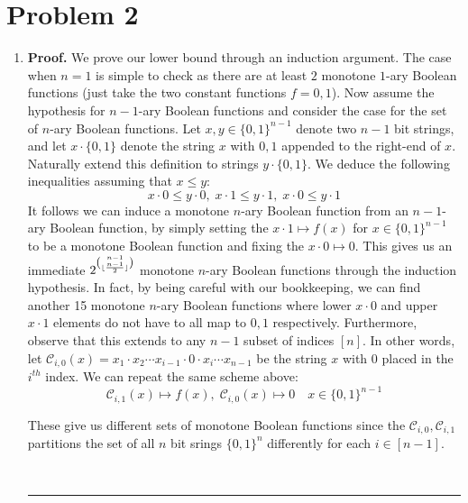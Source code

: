 \documentclass[12pt]{article}%
\DeclarePairedDelimiter\floor{\lfloor}{\rfloor}
\newenvironment{proof}[1][Proof]{\textbf{#1.} }{\ \rule{0.5em}{0.5em}}
\begin{document}
\section{Problem 2}
\begin{enumerate}
  \item
  \begin{proof}
    We prove our lower bound through an induction argument. The case when $n=1$ is simple to check as there are at least $2$ monotone $1$-ary Boolean functions (just take the two constant functions $f = 0,1$). Now assume the hypothesis for $n-1$-ary Boolean functions and consider the case for the set of $n$-ary Boolean functions.
    Let $x,y \in \{0,1\}^{n-1}$ denote two $n-1$ bit strings, and let $x\cdot \{0,1\}$ denote the string $x$ with $0,1$ appended to the right-end of $x$. Naturally extend this definition to strings $y\cdot \{0,1\}$.  We deduce the following inequalities assuming that $x \leq y$:
    $$ x \cdot 0 \leq y \cdot 0, \; x \cdot 1 \leq y \cdot 1, \; x \cdot 0 \leq y \cdot 1 $$
    It follows we can induce a monotone $n$-ary Boolean function from an $n-1$-ary Boolean function, by simply setting the $x\cdot 1 \mapsto f(x)$ for $x \in \{0,1\}^{n-1}$ to be a monotone Boolean function and fixing the $x \cdot 0 \mapsto 0$. This gives us an immediate $2^{n-1 \choose \floor{\frac{n-1}{2}}}$ monotone $n$-ary Boolean functions through the induction hypothesis. In fact, by being careful with our bookkeeping, we can find another 15 monotone $n$-ary Boolean functions where lower $x \cdot 0$ and upper $x \cdot 1$ elements do not have to all map to $0,1$ respectively.
    Furthermore, observe that this extends to any $n-1$ subset of indices $[n]$. In other words, let $\mathcal{C}_{i,0}(x) = x_1 \cdot x_2 \cdots x_{i-1} \cdot 0 \cdot x_{i} \cdots x_{n-1} $ be the string $x$ with $0$ placed in the $i^{th}$ index. We can repeat the same scheme above:
    $$ \mathcal{C}_{i,1}(x) \mapsto f(x), \; \mathcal{C}_{i,0}(x) \mapsto 0 \quad x \in \{0,1\}^{n-1}$$

    These give us different sets of monotone Boolean functions since the $\mathcal{C}_{i,0}, \mathcal{C}_{i,1}$ partitions the set of all $n$ bit srings $\{0,1\}^n$ differently for each $i \in [n-1]$.


\end{proof}
\end{enumerate}
\end{document}
